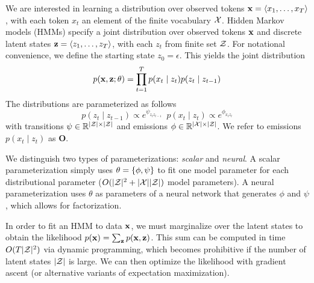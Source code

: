 \documentclass[11pt,a4paper]{article}
\begin{document}
We are interested in learning a distribution over observed tokens
$\mathbf{x} = \langle x_1, \ldots, x_T \rangle$, with each token $x_t$
an element of the finite vocabulary $\mathcal{X}$.
Hidden Markov models (HMMs) specify a joint distribution over 
observed tokens $\mathbf{x}$ and discrete latent states $\mathbf{z} = \langle z_1, \ldots, z_T \rangle$,
with each $z_t$ from finite set $\mathcal{Z}$.
For notational convenience, we define the starting state $z_0=\epsilon$.
This yields the joint distribution
\begin{equation}
p(\mathbf{x}, \mathbf{z}; \theta)
= \prod_{t=1}^T p(x_t\mid z_t)p(z_t \mid z_{t-1})
\end{equation}
\noindent The distributions are parameterized as follows
\begin{equation}
\label{param}
 p(z_t \mid z_{t-1}) \propto e^{\psi_{z_tz_{t-1}}} \; \ p(x_t \mid z_t) \propto e^{\phi_{x_tz_t}}
\end{equation}
with  transitions $\psi \in \mathbb{R}^{|\mathcal{Z}|\times|\mathcal{Z}|}$
and  emissions $\phi \in \mathbb{R}^{|\mathcal{X}| \times |\mathcal{Z}|}$.
We refer to emissions $p(x_t \mid z_t)$ as $\mathbf{O}$.

We distinguish two types of parameterizations: \textit{scalar} and \textit{neural}.
A scalar parameterization simply uses $\theta = \left\{\phi,\psi\right\}$ to fit one model parameter for
each distributional parameter ($O(|\mathcal{Z}|^2 + |\mathcal{X}||\mathcal{Z}|)$ model parameters). A neural parameterization uses $\theta$ as parameters of a neural network
that generates $\phi$ and $\psi$, which allows for factorization. 

In order to fit an HMM to data $\mathbf{x}$,
we must marginalize over the latent states to obtain the likelihood
$p(\mathbf{x}) = \sum_{\mathbf{z}}p(\mathbf{x},\mathbf{z})$.
This sum can be computed in time $O(T|\mathcal{Z}|^2)$ via dynamic programming,
which becomes prohibitive if the number of latent states $|\mathcal{Z}|$ is large.
We can then optimize the likelihood 
with gradient ascent (or alternative variants of expectation maximization).
\end{document}
